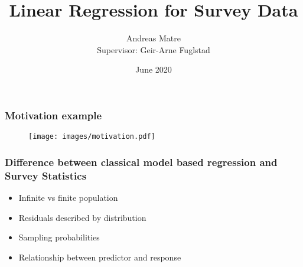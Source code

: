 \documentclass{beamer}
\title{Linear Regression for Survey Data}
\author{Andreas Matre \\
Supervisor: Geir-Arne Fuglstad}
\date{June 2020}
\begin{document}
\frame{\titlepage}


\begin{frame}
  \frametitle{Motivation example}

\begin{figure}
  \centering
  \texttt{[image: images/motivation.pdf]}

  \label{fig:ex1}
\end{figure}

\end{frame}

\begin{frame}
  \frametitle{Difference between classical model based regression and Survey Statistics}

  \begin{itemize}
  \addtolength{\itemsep}{0.5\baselineskip}
  \item Infinite vs finite population %
  \item Residuals described by distribution %
  \item Sampling probabilities                 %
  \item Relationship between predictor and response %
  \end{itemize}
  
\end{frame}

%
%  
\end{document}
